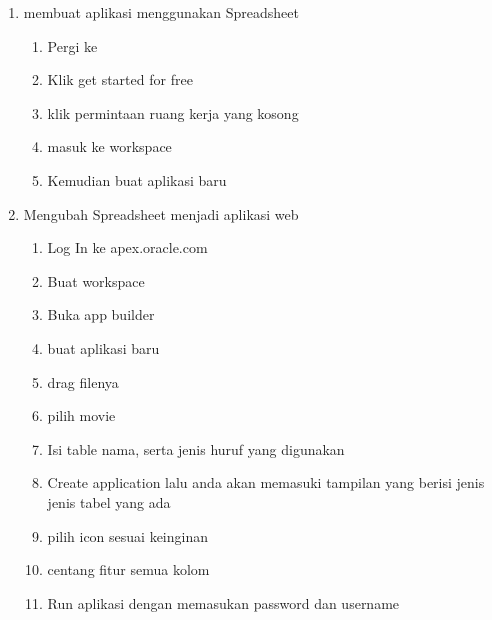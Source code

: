\begin{enumerate}
	\item membuat aplikasi menggunakan Spreadsheet
		\begin{enumerate}[label=\alph*.]
		\item Pergi ke 
		\item Klik get started for free
		\item klik permintaan ruang kerja yang kosong
		\item masuk ke workspace 
		\item Kemudian buat aplikasi baru
		\end{enumerate}
	
	\item Mengubah Spreadsheet menjadi aplikasi web
		\begin{enumerate}
		\item Log In ke apex.oracle.com
		\item Buat workspace
		\item Buka app builder
		\item buat aplikasi baru
		\item drag filenya
		\item pilih movie
		\item Isi table nama, serta jenis huruf yang digunakan
		\item Create application lalu anda akan memasuki tampilan yang berisi jenis jenis tabel yang ada
		\item pilih icon sesuai keinginan
		\item centang fitur semua kolom
		\item Run aplikasi dengan memasukan password dan username
		\end{enumerate}
	
	\end{enumerate}
